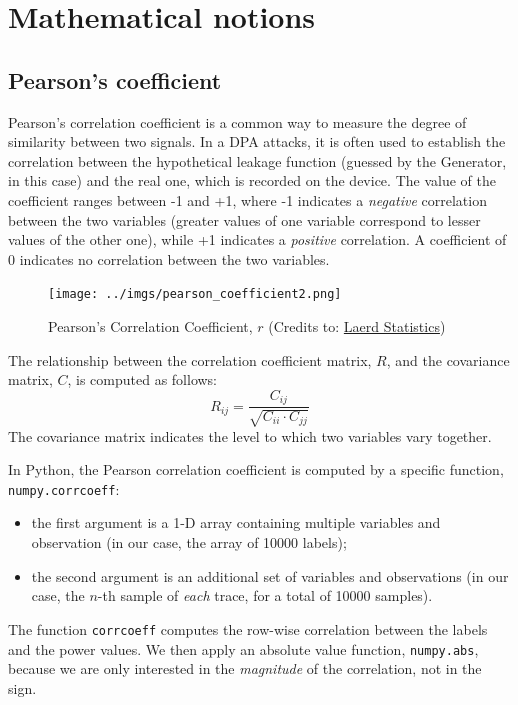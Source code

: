 \documentclass[12pt,a4paper]{book}
\theoremstyle{definition}
\begin{document}
	\appendix
	
	\chapter{Mathematical notions}\label{appendix:maths}
	\section{Pearson's coefficient}
	Pearson's correlation coefficient \cite{Pearson1895} is a common way to measure the degree of similarity between two signals. In a DPA attacks, it is often used to establish the correlation between the hypothetical leakage function (guessed by the Generator, in this case) and the real one, which is recorded on the device. 
	The value of the coefficient ranges between -1 and +1, where -1 indicates a \textit{negative} correlation between the two variables (greater values of one variable correspond to lesser values of the other one), while +1 indicates a \textit{positive} correlation. A coefficient of 0 indicates no correlation between the two variables.	
	\begin{figure}[h!]
		\centering
		\texttt{[image: ../imgs/pearson\_coefficient2.png]}
		\caption{Pearson's Correlation Coefficient, $r$ (Credits to: \href{https://statistics.laerd.com/statistical-guides/pearson-correlation-coefficient-statistical-guide.php}{Laerd Statistics})}
		\label{fig:pearson2}
	\end{figure}
	
	The relationship between the correlation coefficient matrix, $R$, and the covariance matrix, $C$, is computed as follows:
	\[
	R_{ij} = \frac{C_{ij}}{\sqrt{C_{ii} \cdot C_{jj}}}
	\]
	The covariance matrix indicates the level to which two variables vary together.
	
	In Python, the Pearson correlation coefficient is computed by a specific function,  \texttt{numpy.corrcoeff}: 
	\begin{itemize}
		\item the first argument is a 1-D array containing multiple variables and observation (in our case, the array of 10000 labels);
		\item the second argument is an additional set of variables and observations (in our case, the $n$-th sample of \textit{each} trace, for a total of 10000 samples).
	\end{itemize}
	The function \texttt{corrcoeff} computes the row-wise correlation between the labels and the power values. We then apply an absolute value function, \texttt{numpy.abs}, because we are only interested in the \textit{magnitude} of the correlation, not in the sign.
	
\end{document}
